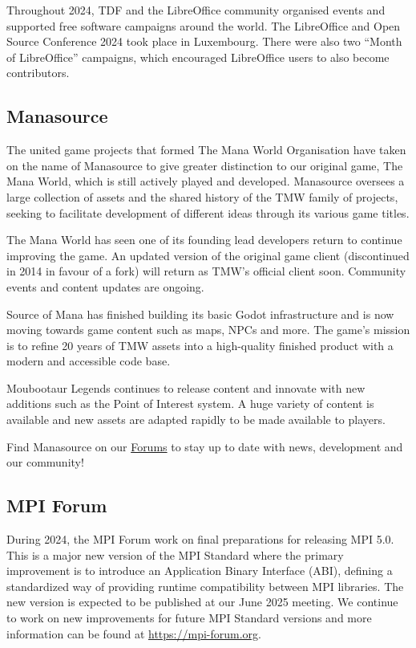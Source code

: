 \documentclass[a4paper]{report}
\begin{document}
Throughout 2024, TDF and the LibreOffice community organised events and supported free software campaigns around the world. The LibreOffice and Open Source Conference 2024 took place in Luxembourg. There were also two ``Month of LibreOffice'' campaigns, which encouraged LibreOffice users to also become contributors.

\subsection{Manasource}

The united game projects that formed The Mana World Organisation have taken on the name of Manasource to give greater distinction to our original game, The Mana World, which is still actively played and developed. Manasource oversees a large collection of assets and the shared history of the TMW family of projects, seeking to facilitate development of different ideas through its various game titles.

The Mana World has seen one of its founding lead developers return to continue improving the game. An updated version of the original game client (discontinued in 2014 in favour of a fork) will return as TMW's official client soon. Community events and content updates are ongoing.

Source of Mana has finished building its basic Godot infrastructure and is now moving towards game content such as maps, NPCs and more. The game's mission is to refine 20 years of TMW assets into a high-quality finished product with a modern and accessible code base.

Moubootaur Legends continues to release content and innovate with new additions such as the Point of Interest system. A huge variety of content is available and new assets are adapted rapidly to be made available to players.

Find Manasource on our \href{https://forums.themanaworld.org/}{Forums} to stay up to date with news, development and our community!

\subsection{MPI Forum}

During 2024, the MPI Forum work on final preparations for releasing MPI 5.0. This is a major new version of the MPI Standard where the primary improvement is to introduce an Application Binary Interface (ABI), defining a standardized way of providing runtime compatibility between MPI libraries. The new version is expected to be published at our June 2025 meeting. We continue to work on new improvements for future MPI Standard versions and more information can be found at \href{https://mpi-forum.org}{https://mpi-forum.org}.
\end{document}
